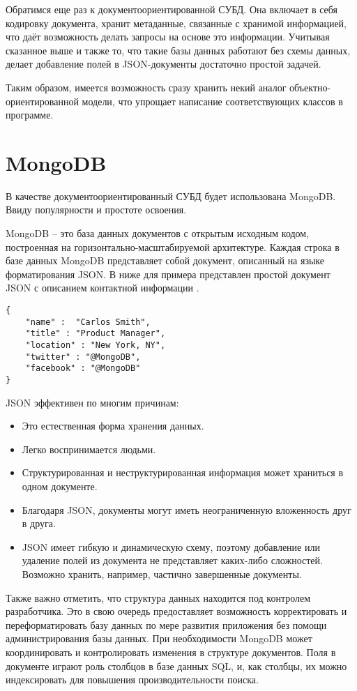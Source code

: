 \documentclass[14pt]{extreport}
\begin{document}
Обратимся еще раз к документоориентированной СУБД. Она включает в себя кодировку документа, хранит метаданные, связанные с хранимой информацией, что даёт возможность делать запросы на основе это информации. 
Учитывая сказанное выше и также то, что такие базы данных работают без схемы данных, делает добавление полей в JSON-документы достаточно простой задачей. 

Таким образом, имеется возможность сразу хранить некий аналог объектно-ориентированной модели, что упрощает написание соответствующих классов в программе.

\section{MongoDB} 
В качестве документоориентированный СУБД будет использована MongoDB. Ввиду популярности и простоте освоения.

MongoDB -- это база данных документов с открытым исходным кодом, построенная на горизонтально-масштабируемой архитектуре. Каждая строка в базе данных MongoDB представляет собой документ, описанный на языке форматирования JSON.
В ниже для примера представлен простой документ JSON с описанием контактной информации \cite{nosqlMongo}.
\begin{lstlisting}
{
	"name" :  "Carlos Smith",
	"title" : "Product Manager",
	"location" : "New York, NY",
	"twitter" : "@MongoDB",
	"facebook" : "@MongoDB"
}
\end{lstlisting}

JSON эффективен по многим причинам:
\begin{itemize}
	\item Это естественная форма хранения данных.
	\item Легко воспринимается людьми.
	\item Структурированная и неструктурированная информация может храниться в одном документе.
    \item Благодаря JSON, документы могут иметь неограниченную вложенность друг в друга.
    \item JSON имеет гибкую и динамическую схему, поэтому добавление или удаление полей из документа не представляет каких-либо сложностей. Возможно хранить, например, частично завершенные документы.
\end{itemize}

Также важно отметить, что структура данных находится под контролем разработчика. Это в свою очередь предоставляет возможность корректировать и переформатировать базу данных по мере развития приложения без помощи администрирования базы данных. При необходимости MongoDB может координировать и контролировать изменения в структуре документов. Поля в документе играют роль столбцов в базе данных SQL, и, как столбцы, их можно индексировать для повышения производительности поиска.
\end{document}
